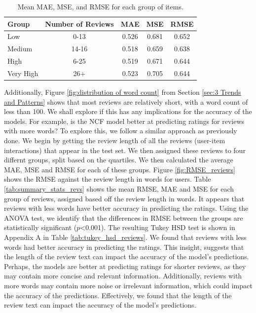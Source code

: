 \begin{table}[htbp]
    \centering
    \begin{tabular}{lcccc}
        \toprule
        \textbf{Group} & \textbf{Number of Reviews}&\textbf{MAE} & \textbf{MSE} & \textbf{RMSE} \\
        \midrule
        Low & 0-13                &             0.526 &             0.681 &              0.652 \\
        Medium & 14-16               &             0.518 &             0.659 &              0.638 \\

        High & 6-25                &             0.519 &             0.671 &              0.644 \\

        Very High & 26+                 &             0.523 &             0.705 &              0.644 \\

        \bottomrule
    \end{tabular}
    \caption{Mean MAE, MSE, and RMSE for each group of items.}
    \label{tab:summary_stats_items}
\end{table}

Additionally, Figure \ref{fig:distribution of word count} from Section \ref{sec:3 Trends and Patterns} shows that most reviews are relatively short, with a word count of less than 100. We shall explore if this has any implications for the accuracy of the models. For example, is the NCF model better at predicting ratings for reviews with more words? To explore this, we follow a similar approach as previously done. We begin by getting the review length of all the reviews (user-item interactions) that appear in the test set. We then assigned these reviews to four differnt groups, split based on the quartiles. We then calculated the average MAE, MSE and RMSE for each of these groups. Figure \ref{fig:RMSE_reviews} shows the RMSE against the review length in words for users. Table \ref{tab:summary_stats_revs} shows the mean RMSE, MAE and MSE for each group of reviews, assigned based off the review length in words. It appears that reviews with less words have better accuracy in predicting the ratings. Using the ANOVA test, we identify that the differences in RMSE between the groups are statistically significant ($p$<0.001). The resulting Tukey HSD test is shown in Appendix A in Table \ref{tab:tukey_hsd_reviews}. We found that reviews with less words had better accuracy in predicting the ratings. This insight, suggests that the length of the review text can impact the accuracy of the model's predictions. Perhaps, the models are better at predicting ratings for shorter reviews, as they may contain more concise and relevant information. Additionally, reviews with more words may contain more noise or irrelevant information, which could impact the accuracy of the predictions. Effectively, we found that the length of the review text can impact the accuracy of the model's predictions. 

